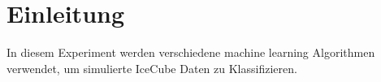 \section{Einleitung}
In diesem Experiment werden verschiedene machine learning Algorithmen verwendet, um simulierte IceCube Daten zu Klassifizieren.
